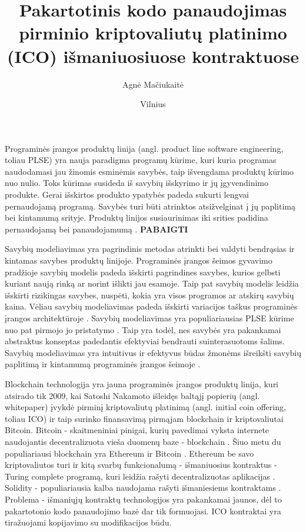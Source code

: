 \documentclass{VUMIFPSkursinis}
\title{Pakartotinis kodo panaudojimas pirminio kriptovaliutų platinimo (ICO) išmaniuosiuose kontraktuose}
\author{Agnė Mačiukaitė}
\date{Vilnius \\ \the\year}
\begin{document}
\maketitle

\tableofcontents

%
Programinės įrangos produktų linija (angl. product line software engineering, toliau PLSE) yra nauja paradigma programų kūrime, kuri kuria programas naudodamasi jau žinomis esminėmis savybės, taip išvengdama produktų kūrimo nuo nulio. Toks kūrimas susideda iš savybių išskyrimo ir jų įgyvendinimo produkte. Gerai išskirtos produkto ypatybės padeda sukurti lengvai pernaudojamą programą. Savybės turi būti atrinktos atsižvelginat į jų paplitimą bei kintamumą srityje. Produktų linijos susiaurinimas iki srities padidina pernaudojamą bei panaudojamumą \cite{Lee2015}. \textbf{PABAIGTI}

Savybių modeliavimas yra pagrindinis metodas atrinkti bei valdyti bendrąsias ir kintamas savybes produktų linijoje. Programinės įrangos šeimos gyvavimo pradžioje savybių modelis padeda išskirti pagrindines savybes, kurios gelbsti kuriant naują rinką ar  norint išlikti jau esamoje. Taip pat savybių modelis leidžia išskirti rizikingas savybes, nuspėti, kokia yra visos programos ar atskirų savybių kaina. Vėliau savybių modeliavimas padeda išskirti variacijos taškus programinės įrangos architektūroje \cite{Czarnecki2004}. Savybių modeliavimas yra populiariausias PLSE kūrime nuo pat pirmojo jo pristatymo \cite{Kang1990}. Taip yra todėl, nes savybės yra pakankamai abstraktus konseptas padedantis efektyviai bendrauti suinterasuotoms šalims. Savybių modeliavimas yra intuitivus ir efektyvus būdas žmonėms išreikšti savybių paplitimą ir kintamumą programinės įrangos šeimoje \cite{Kang2013}. 

Blockchain technologija yra jauna programinės įrangos produktų linija, kuri atsirado tik 2009, kai Satoshi Nakamoto išleidęs baltąjį popierių (angl. whitepaper) \cite{Nakamoto2008} įvykdė pirminį kriptovaliutų platinimą (angl. initial coin offering, toliau ICO)  ir taip surinko finansavimą pirmąjam blockchain ir kriptovaliutai Bitcoin. Bitcoin - skaitmeniniai pinigai, kurių pavedimai vyksta internete naudojantis decentralizuota vieša duomenų baze - blockchain \cite{Swan2015}. Šiuo metu du populiariausi blockchain yra Ethereum ir Bitcoin \cite{Luu}. Ethereum be savo kriptovaliutos turi ir kitą svarbų funkcionalumą - išmaniuosius kontraktus - Turing complete programą, kuri leidžia rašyti decentralizuotas aplikacijas \cite{Buterin2014}. Solidity - populiariausia kalba naudojama rašyti išmaniesiems kontraktams \cite{Dannen}. Problema - išmaniųjų kontraktų technologijos yra pakankamai jaunos, dėl to pakartotonio kodo panaudojimo bazė dar tik formuojasi. ICO kontraktai yra tiražuojami kopijavimo su modifikacijos būdu.
\end{document}
